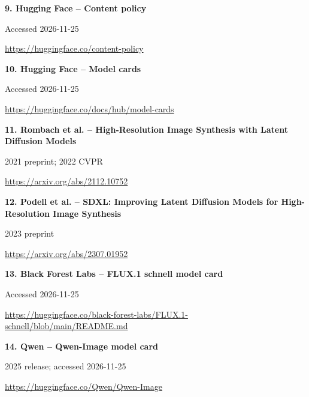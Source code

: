 \documentclass[11pt,a4paper]{article}
\begin{document}
\noindent\begin{minipage}{\linewidth}\textbf{9. Hugging Face -- Content policy}\par{\small Accessed 2026-11-25\par\url{https://huggingface.co/content-policy}}\par
\end{minipage}\par\vspace{2mm}
\noindent\begin{minipage}{\linewidth}\textbf{10. Hugging Face -- Model cards}\par{\small Accessed 2026-11-25\par\url{https://huggingface.co/docs/hub/model-cards}}\par
\end{minipage}\par\vspace{2mm}
\noindent\begin{minipage}{\linewidth}\textbf{11. Rombach et al. -- High-Resolution Image Synthesis with Latent Diffusion Models}\par{\small 2021 preprint; 2022 CVPR\par\url{https://arxiv.org/abs/2112.10752}}\par
\end{minipage}\par\vspace{2mm}
\noindent\begin{minipage}{\linewidth}\textbf{12. Podell et al. -- SDXL: Improving Latent Diffusion Models for High-Resolution Image Synthesis}\par{\small 2023 preprint\par\url{https://arxiv.org/abs/2307.01952}}\par
\end{minipage}\par\vspace{2mm}
\noindent\begin{minipage}{\linewidth}\textbf{13. Black Forest Labs -- FLUX.1 schnell model card}\par{\small Accessed 2026-11-25\par\url{https://huggingface.co/black-forest-labs/FLUX.1-schnell/blob/main/README.md}}\par
\end{minipage}\par\vspace{2mm}
\noindent\begin{minipage}{\linewidth}\textbf{14. Qwen -- Qwen-Image model card}\par{\small 2025 release; accessed 2026-11-25\par\url{https://huggingface.co/Qwen/Qwen-Image}}\par
\end{minipage}\par\vspace{2mm}
\end{document}
